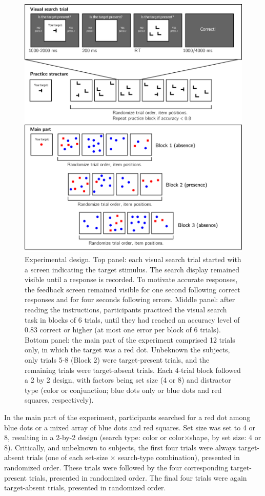 \documentclass[
  english,
  man]{apa6}
\begin{document}
\begin{figure}
\includegraphics[width=\textwidth]{figures/designExp1} \caption{Experimental design. Top panel: each visual search trial started with a screen indicating the target stimulus. The search display remained visible until a response is recorded. To motivate accurate responses, the feedback screen remained visible for one second following correct responses and for four seconds following errors. Middle panel: after reading the instructions, participants practiced the visual search task in blocks of 6 trials, until they had reached an accuracy level of 0.83 correct or higher (at most one error per block of 6 trials). Bottom panel: the main part of the experiment comprised 12 trials only, in which the target was a red dot. Unbeknown the subjects, only trials 5-8 (Block 2) were target-present trials, and the remaining trials were target-absent trials. Each 4-trial block followed a 2 by 2 design, with factors being set size (4 or 8) and distractor type (color or conjunction; blue dots only or blue dots and red squares, respectively).}\label{fig:design}
\end{figure}

In the main part of the experiment, participants searched for a red dot among blue dots or a mixed array of blue dots and red squares. Set size was set to 4 or 8, resulting in a 2-by-2 design (search type: color or color\(\times\)shape, by set size: 4 or 8). Critically, and unbeknown to subjects, the first four trials were always target-absent trials (one of each set-size \(\times\) search-type combination), presented in randomized order. These trials were followed by the four corresponding target-present trials, presented in randomized order. The final four trials were again target-absent trials, presented in randomized order.
\end{document}
